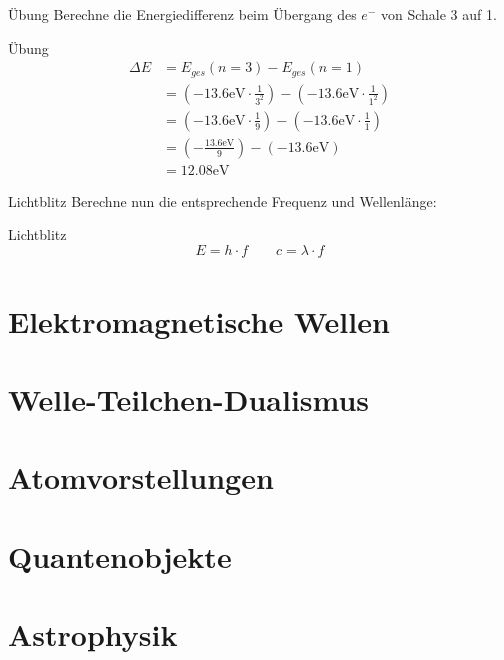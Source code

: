 \documentclass[11pt,a4paper,oneside]{article}
\begin{document}
	\newpage
	\begin{aufgabe}{Übung}
		Berechne die Energiedifferenz beim Übergang des $e^{-}$ von Schale 3 auf 1. 
	\end{aufgabe}
	
	\begin{loesung}{Übung}
		\begin{align*}
			\Delta E &= E_{ges} (n = 3) - E_{ges} (n = 1)\\
			&= \left( -13.6 \mathrm{eV} \cdot \frac{1}{3^2}\right) - \left( -13.6 \mathrm{eV} \cdot \frac{1}{1^2}\right)\\ 
			&= \left( -13.6 \mathrm{eV} \cdot \frac{1}{9}\right) - \left( -13.6 \mathrm{eV} \cdot \frac{1}{1}\right)\\ 
			&= \left( - \frac{13.6 \mathrm{eV}}{9}\right) - \left( - 13.6 \mathrm{eV} \right)\\
			&= 12.08 \mathrm{eV}
		\end{align*}
	\end{loesung}
	
	\begin{aufgabe}{Lichtblitz}
		Berechne nun die entsprechende Frequenz und Wellenlänge: 
	\end{aufgabe}
	
	\begin{loesung}{Lichtblitz}
		\[
		E = h \cdot f \qquad c = \lambda \cdot f 
		\]
		\begin{align*}
		\end{align*}
	\end{loesung}
	
	\newpage
	
	\section{Elektromagnetische Wellen}

	\section{Welle-Teilchen-Dualismus}
	\section{Atomvorstellungen}
	
	
	\section{Quantenobjekte}
	\section{Astrophysik}
	
\end{document}
